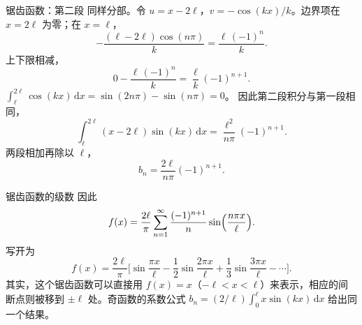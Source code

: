 \documentclass[fontset=windows, chinese, 10pt, xcolor=dvipsnames]{beamer}
\begin{document}
\begin{frame}{锯齿函数：第二段}
  同样分部。令 $u=x-2\ell$，$v=-\cos(kx)/k$。边界项在 $x=2\ell$ 为零；在 $x=\ell$，
  \begin{equation*}
    -\frac{(\ell-2\ell)\cos(n\pi)}{k}
    =\frac{\ell\,(-1)^n}{k}.
  \end{equation*}
  上下限相减，
  \begin{equation*}
    0-\frac{\ell\,(-1)^n}{k}
    =\frac{\ell}{k}(-1)^{n+1}.
  \end{equation*}
  $\displaystyle\int_{\ell}^{2\ell}\cos(kx)\,\mathrm{d}x=\sin(2n\pi)-\sin(n\pi)=0$。
  因此第二段积分与第一段相同，
  \begin{equation*}
    \int_{\ell}^{2\ell}(x-2\ell)\sin(kx)\,\mathrm{d}x
    =\frac{\ell^2}{n\pi}(-1)^{n+1}.
  \end{equation*}
  两段相加再除以 $\ell$，
  \begin{equation*}
    b_n=\frac{2\ell}{n\pi}(-1)^{n+1}.
  \end{equation*}
\end{frame}

\begin{frame}{锯齿函数的级数}
  因此
  \begin{equation*}
    f(x)=\frac{2\ell}{\pi}\sum_{n=1}^{\infty}
      \frac{(-1)^{n+1}}{n}
      \sin\Bigl(\frac{n\pi x}{\ell}\Bigr).
  \end{equation*}
  写开为
  \begin{equation*}
    f(x)=\frac{2\ell}{\pi}\Biggl[
      \sin\frac{\pi x}{\ell}
      -\frac12\sin\frac{2\pi x}{\ell}
      +\frac13\sin\frac{3\pi x}{\ell}-\cdots
    \Biggr].
  \end{equation*}
  其实，这个锯齿函数可以直接用 $f(x)=x$（$-\ell<x<\ell$）来表示，相应的间断点则被移到 $\pm\ell$ 处。奇函数的系数公式 $b_n=(2/\ell)\int_0^{\ell} x\sin(kx)\,\mathrm{d}x$ 给出同一个结果。
\end{frame}
\end{document}
